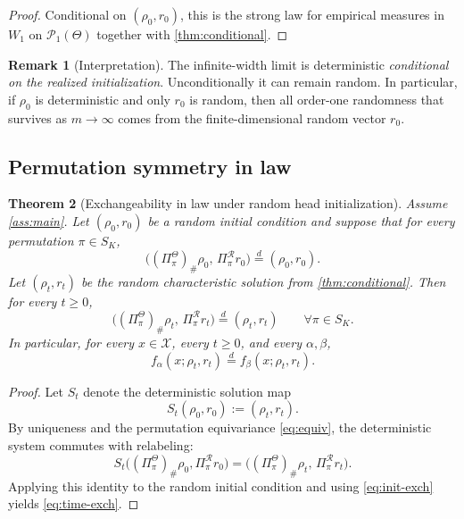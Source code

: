 \documentclass[11pt]{article}
\newtheorem{theorem}{Theorem}[section]
\theoremstyle{definition}
\newtheorem{remark}[theorem]{Remark}
\newcommand{\PP}{\mathcal{P}}
\newcommand{\W}{W_1}
\begin{document}
\begin{proof}
Conditional on $(\rho_0,r_0)$, this is the strong law for empirical measures in $\W$ on $\PP_1(\Theta)$ together with \cref{thm:conditional}.
\end{proof}

\begin{remark}[Interpretation]
The infinite-width limit is deterministic \emph{conditional on the realized initialization}. Unconditionally it can remain random. In particular, if $\rho_0$ is deterministic and only $r_0$ is random, then all order-one randomness that survives as $m\to\infty$ comes from the finite-dimensional random vector $r_0$.
\end{remark}

\subsection{Permutation symmetry in law}

\begin{theorem}[Exchangeability in law under random head initialization]
\label{thm:exchangeable}
Assume \cref{ass:main}. Let $(\rho_0,r_0)$ be a random initial condition and suppose that for every permutation $\pi\in S_K$,
\begin{equation}
  \bigl(
    (\Pi_\pi^\Theta)_\#\rho_0,\,
    \Pi_\pi^\mathcal R r_0
  \bigr)
  \stackrel{d}{=}
  (\rho_0,r_0).
  \label{eq:init-exch}
\end{equation}
Let $(\rho_t,r_t)$ be the random characteristic solution from \cref{thm:conditional}. Then for every $t\ge 0$,
\begin{equation}
  \bigl(
    (\Pi_\pi^\Theta)_\#\rho_t,\,
    \Pi_\pi^\mathcal R r_t
  \bigr)
  \stackrel{d}{=}
  (\rho_t,r_t)
  \qquad
  \forall \pi\in S_K.
  \label{eq:time-exch}
\end{equation}
In particular, for every $x\in\mathcal X$, every $t\ge 0$, and every $\alpha,\beta$,
\[
  f_\alpha(x;\rho_t,r_t)\stackrel{d}{=}f_\beta(x;\rho_t,r_t).
\]
\end{theorem}

\begin{proof}
Let $S_t$ denote the deterministic solution map
\[
  S_t(\rho_0,r_0):=(\rho_t,r_t).
\]
By uniqueness and the permutation equivariance \eqref{eq:equiv}, the deterministic system commutes with relabeling:
\[
  S_t\bigl((\Pi_\pi^\Theta)_\#\rho_0,\Pi_\pi^\mathcal R r_0\bigr)
  =
  \bigl(
    (\Pi_\pi^\Theta)_\#\rho_t,\,
    \Pi_\pi^\mathcal R r_t
  \bigr).
\]
Applying this identity to the random initial condition and using \eqref{eq:init-exch} yields \eqref{eq:time-exch}.
\end{proof}
\end{document}
